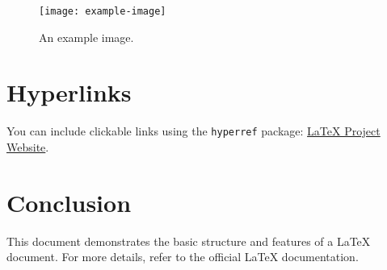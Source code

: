 \documentclass[a4paper,12pt]{article} %
\begin{document}
\begin{figure}[h]
    \centering
    \texttt{[image: example-image]} %
    \caption{An example image.}
    \label{fig:example}
\end{figure}

\section{Hyperlinks}
You can include clickable links using the \texttt{hyperref} package:
\href{https://www.latex-project.org}{LaTeX Project Website}.

\section{Conclusion}
This document demonstrates the basic structure and features of a LaTeX document. For more details, refer to the official LaTeX documentation.
\end{document}
